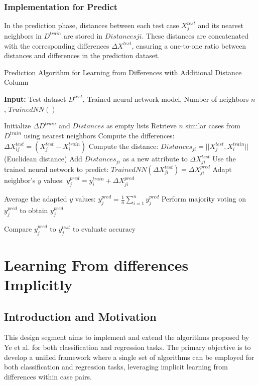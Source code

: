 \documentclass[a4paper, 12pt]{report}
\begin{document}
\subsubsection{Implementation for Predict}
In the prediction phase, distances between each test case $X^{test}_j$ and its nearest neighbors in $D^{train}$ are stored in $Distances{ji}$.
These distances are concatenated with the corresponding differences $\Delta X^{test}$, ensuring a one-to-one ratio between distances and differences in the prediction dataset.

\begin{algorithm}[H]
	\caption{Prediction Algorithm for Learning from Differences with Additional Distance Column}
	\label{alg:learning_from_differences_variant_3_predict}

	\textbf{Input:} Test dataset $D^{test}$, Trained neural network model, Number of neighbors $n$, $Trained NN()$

	\begin{algorithmic}[1]
		\State Initialize $\Delta D^{train}$ and $Distances$ as empty lists
		    \State Retrieve $n$ similar cases from $D^{train}$ using nearest neighbors
		        \State Compute the differences: $\Delta X^{test}_{ij} = (X^{test}_j - X^{train}_i)$
		        \State Compute the distance: $Distances_{ji} = ||X^{test}_j,  X^{train}_i||$ (Euclidean distance)
		        \State Add $Distances_{ji}$ as a new attribute to $\Delta X^{test}_{ji}$
		        \State Use the trained neural network to predict: $Trained NN(\Delta X^{test}_{ji}) = \Delta X^{pred}_{ji}$
		        \State Adapt neighbor's $y$ values: $y^{pred}_j = y^{train}_i + \Delta X^{pred}_{ji}$
		    \EndFor

		        \State Average the adapted $y$ values: $y^{pred}_j = \frac{1}{n} \sum_{i=1}^{n} y^{pred}_j$
		        \State Perform majority voting on $y^{pred}_j$ to obtain $y^{pred}_j$
		    \EndIf

		    \State Compare $y^{pred}_j$ to $y^{test}_j$ to evaluate accuracy
		\EndFor
	\end{algorithmic}
\end{algorithm}

\section{Learning From differences Implicitly}
\subsection{Introduction and Motivation}
This design segment aims to implement and extend the algorithms proposed by Ye et al. \cite{ye2021learning} for both classification and regression tasks. 
The primary objective is to develop a unified framework where a single set of algorithms can be employed for 
both classification and regression tasks, leveraging implicit learning from differences within case pairs.
\end{document}
